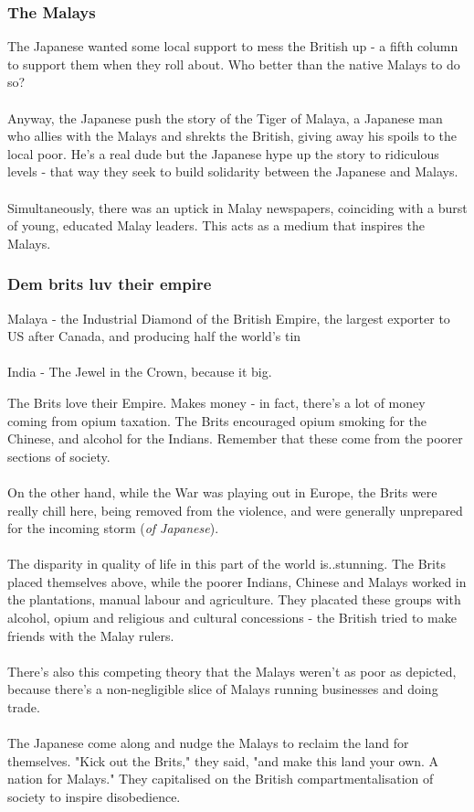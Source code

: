\documentclass[a4paper]{article}
\begin{document}
\subsubsection{The Malays}
The Japanese wanted some local support to mess the British up - a fifth column to support them when they roll about. Who better than the native Malays to do so?\\
\\
Anyway, the Japanese push the story of the Tiger of Malaya, a Japanese man who allies with the Malays and shrekts the British, giving away his spoils to the local poor. He's a real dude but the Japanese hype up the story to ridiculous levels - that way they seek to build solidarity between the Japanese and Malays.\\
\\
Simultaneously, there was an uptick in Malay newspapers, coinciding with a burst of young, educated Malay leaders. This acts as a medium that inspires the Malays.
\subsubsection{Dem brits luv their empire}
\begin{displayquote}
	Malaya - the Industrial Diamond of the British Empire, the largest exporter to US after Canada, and producing half the world's tin\\
	\\
	India - The Jewel in the Crown, because it big.
\end{displayquote}
The Brits love their Empire. Makes money - in fact, there's a lot of money coming from opium taxation. The Brits encouraged opium smoking for the Chinese, and alcohol for the Indians. Remember that these come from the poorer sections of society.\\
\\
On the other hand, while the War was playing out in Europe, the Brits were really chill here, being removed from the violence, and were generally unprepared for the incoming storm (\textit{of Japanese}).\\
\\
The disparity in quality of life in this part of the world is..stunning. The Brits placed themselves above, while the poorer Indians, Chinese and Malays worked in the plantations, manual labour and agriculture. They placated these groups with alcohol, opium and religious and cultural concessions - the British tried to make friends with the Malay rulers.\\
\\
There's also this competing theory that the Malays weren't as poor as depicted, because there's a non-negligible slice of Malays running businesses and doing trade.\\
\\
The Japanese come along and nudge the Malays to reclaim the land for themselves. "Kick out the Brits," they said, "and make this land your own. A nation for Malays." They capitalised on the British compartmentalisation of society to inspire disobedience.
\end{document}
